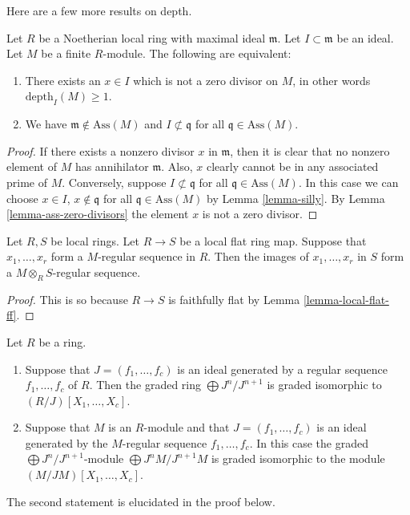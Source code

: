 \noindent
Here are a few more results on depth.

\begin{lemma}
\label{lemma-ideal-nonzerodivisor}
Let $R$ be a Noetherian local ring with
maximal ideal $\mathfrak m$. Let $I \subset \mathfrak m$
be an ideal. Let $M$ be a finite $R$-module.
The following are equivalent:
\begin{enumerate}
\item There exists an $x \in I$ which is not a zero
divisor on $M$, in other words $\text{depth}_I(M) \geq 1$.
\item We have $\mathfrak m \not\in \text{Ass}(M)$ and
$I \not \subset \mathfrak q$ for all $\mathfrak q \in \text{Ass}(M)$.
\end{enumerate}
\end{lemma}

\begin{proof}
If there exists a nonzero divisor $x$ in $\mathfrak m$,
then it is clear that no nonzero element of $M$ has annihilator
$\mathfrak m$. Also, $x$ clearly cannot be in any associated
prime of $M$. Conversely, suppose $I \not \subset \mathfrak q$
for all $\mathfrak q \in \text{Ass}(M)$. In this case we can
choose $x \in I$, $x \not \in \mathfrak q$ for all
$\mathfrak q \in \text{Ass}(M)$ by Lemma \ref{lemma-silly}.
By Lemma \ref{lemma-ass-zero-divisors} the element $x$
is not a zero divisor.
\end{proof}

\begin{lemma}
\label{lemma-flat-increases-depth}
Let $R, S$ be local rings.
Let $R \to S$ be a local flat ring map.
Suppose that $x_1, \ldots, x_r$ form
a $M$-regular sequence in $R$.
Then the images of $x_1, \ldots, x_r$ in
$S$ form a $M\otimes_RS$-regular sequence.
\end{lemma}

\begin{proof}
This is so because $R\to S$ is faithfully flat
by Lemma \ref{lemma-local-flat-ff}.
\end{proof}

\begin{lemma}
\label{lemma-regular-quasi-regular}
Let $R$ be a ring.
\begin{enumerate}
\item Suppose that $J = (f_1, \ldots, f_c)$ is an ideal generated
by a regular sequence $f_1, \ldots, f_c$ of $R$. Then the graded
ring $\bigoplus J^n/J^{n + 1}$ is graded isomorphic to
$(R/J)[X_1, \ldots, X_c]$.
\item Suppose that $M$ is an $R$-module and that $J = (f_1, \ldots, f_c)$
is an ideal generated by the $M$-regular sequence
$f_1, \ldots, f_c$. In this case the graded
$\bigoplus J^n/J^{n + 1}$-module $\bigoplus J^nM/J^{n + 1}M$
is graded isomorphic to the module $(M/JM)[X_1, \ldots, X_c]$.
\end{enumerate}
The second statement is elucidated in the proof below.
\end{lemma}

